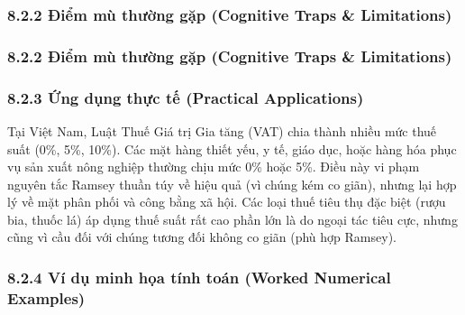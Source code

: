 \documentclass[
]{article}
\begin{document}
\subsubsection{8.2.2 Điểm mù thường gặp (Cognitive Traps \&
Limitations)}\label{ux111iux1ec3m-muxf9-thux1b0ux1eddng-gux1eb7p-cognitive-traps-limitations-51}

\subsubsection{8.2.2 Điểm mù thường gặp (Cognitive Traps \&
Limitations)}\label{ux111iux1ec3m-muxf9-thux1b0ux1eddng-gux1eb7p-cognitive-traps-limitations-52}

\subsubsection{8.2.3 Ứng dụng thực tế (Practical
Applications)}\label{ux1ee9ng-dux1ee5ng-thux1ef1c-tux1ebf-practical-applications-26}

Tại Việt Nam, Luật Thuế Giá trị Gia tăng (VAT) chia thành nhiều mức thuế
suất (0\%, 5\%, 10\%). Các mặt hàng thiết yếu, y tế, giáo dục, hoặc hàng
hóa phục vụ sản xuất nông nghiệp thường chịu mức 0\% hoặc 5\%. Điều này
vi phạm nguyên tắc Ramsey thuần túy về hiệu quả (vì chúng kém co giãn),
nhưng lại hợp lý về mặt phân phối và công bằng xã hội. Các loại thuế
tiêu thụ đặc biệt (rượu bia, thuốc lá) áp dụng thuế suất rất cao phần
lớn là do ngoại tác tiêu cực, nhưng cũng vì cầu đối với chúng tương đối
không co giãn (phù hợp Ramsey).

\subsubsection{8.2.4 Ví dụ minh họa tính toán (Worked Numerical
Examples)}\label{vuxed-dux1ee5-minh-hux1ecda-tuxednh-touxe1n-worked-numerical-examples-25}
\end{document}
